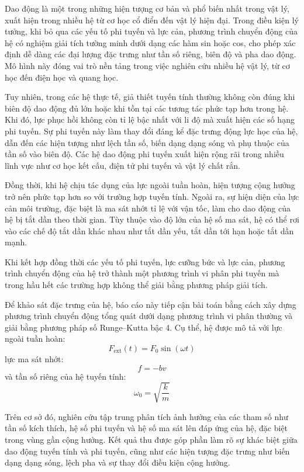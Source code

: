 Dao động là một trong những hiện tượng cơ bản và phổ biến nhất trong vật lý, xuất hiện trong nhiều hệ từ cơ học cổ điển đến vật lý hiện đại. Trong điều kiện lý tưởng, khi bỏ qua các yếu tố phi tuyến và lực cản, phương trình chuyển động của hệ có nghiệm giải tích tường minh dưới dạng các hàm sin hoặc cos, cho phép xác định dễ dàng các đại lượng đặc trưng như tần số riêng, biên độ và pha dao động. Mô hình này đóng vai trò nền tảng trong việc nghiên cứu nhiều hệ vật lý, từ cơ học đến điện học và quang học.

Tuy nhiên, trong các hệ thực tế, giả thiết tuyến tính thường không còn đúng khi biên độ dao động đủ lớn hoặc khi tồn tại các tương tác phức tạp hơn trong hệ. Khi đó, lực phục hồi không còn tỉ lệ bậc nhất với li độ mà xuất hiện các số hạng phi tuyến. Sự phi tuyến này làm thay đổi đáng kể đặc trưng động lực học của hệ, dẫn đến các hiện tượng như lệch tần số, biến dạng dạng sóng và phụ thuộc của tần số vào biên độ. Các hệ dao động phi tuyến xuất hiện rộng rãi trong nhiều lĩnh vực như cơ học kết cấu, điện tử phi tuyến và vật lý chất rắn.

Đồng thời, khi hệ chịu tác dụng của lực ngoài tuần hoàn, hiện tượng cộng hưởng trở nên phức tạp hơn so với trường hợp tuyến tính. Ngoài ra, sự hiện diện của lực cản môi trường, đặc biệt là ma sát nhớt tỉ lệ với vận tốc, làm cho dao động của hệ bị tắt dần theo thời gian. Tùy thuộc vào độ lớn của hệ số ma sát, hệ có thể rơi vào các chế độ tắt dần khác nhau như tắt dần yếu, tắt dần tới hạn hoặc tắt dần mạnh.

Khi kết hợp đồng thời các yếu tố phi tuyến, lực cưỡng bức và lực cản, phương trình chuyển động của hệ trở thành một phương trình vi phân phi tuyến mà trong hầu hết các trường hợp không thể giải bằng phương pháp giải tích.

Để khảo sát đặc trưng của hệ, báo cáo này tiếp cận bài toán bằng cách xây dựng phương trình chuyển động tổng quát dưới dạng phương trình vi phân thường và giải bằng phương pháp số Runge–Kutta bậc 4. Cụ thể, hệ được mô tả với lực ngoài tuần hoàn:
\begin{equation}
    F_{\mathrm{ext}}(t) = F_0 \sin(\omega t)
\end{equation}
lực ma sát nhớt:
\begin{equation}
    f=-bv
\end{equation}
và tần số riêng của hệ tuyến tính:
\begin{equation}
    \omega_0=\sqrt{\frac{k}{m}}
\end{equation}

Trên cơ sở đó, nghiên cứu tập trung phân tích ảnh hưởng của các tham số như tần số kích thích, hệ số phi tuyến và hệ số ma sát lên đáp ứng của hệ, đặc biệt trong vùng gần cộng hưởng. Kết quả thu được góp phần làm rõ sự khác biệt giữa dao động tuyến tính và phi tuyến, cũng như các hiện tượng đặc trưng như biến dạng dạng sóng, lệch pha và sự thay đổi điều kiện cộng hưởng.
